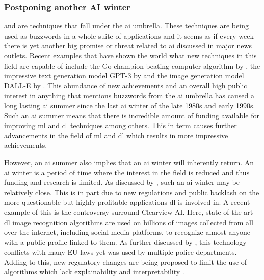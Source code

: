 
\subsubsection{Postponing another AI winter}
\label{subsubsec:bci_gaining_popularity_improved_data_processing_no_ai_winter}

 and  are techniques that fall under the \gls{ai} umbrella.
These techniques are being used as buzzwords in a whole suite of applications and it seems as if every week there is yet another big promise or threat related to \gls{ai} discussed in major news outlets.
Recent examples that have shown the world what new techniques in this field are capable of include the Go champion beating computer algorithm by \citet{alphago}, the impressive text generation model GPT-3 by \citet{GPT3} and the image generation model DALL-E by \citet{dall_e}.
This abundance of new achievements and an overall high public interest in anything that mentions buzzwords from the \gls{ai} umbrella has caused a long lasting \gls{ai} summer since the last \gls{ai} winter of the late 1980s and early 1990s.
Such an \gls{ai} summer means that there is incredible amount of funding available for improving \gls{ml} and \gls{dl} techniques among others.
This in term causes further advancements in the field of \gls{ml} and \gls{dl} which results in more impressive achievements.

However, an \gls{ai} summer also implies that an \gls{ai} winter will inherently return.
An \gls{ai} winter is a period of time where the interest in the field is reduced and thus funding and research is limited.
As discussed by \citet{new_ai_winter}, such an \gls{ai} winter may be relatively close.
This is in part due to new regulations and public backlash on the more questionable but highly profitable applications \gls{dl} is involved in.
A recent example of this is the controversy surround Clearview AI.
Here, state-of-the-art \gls{dl} image recognition algorithms are used on billions of images collected from all over the internet, including social-media platforms, to recognize almost anyone with a public profile linked to them.
As further discussed by \citet{clearview_ai}, this technology conflicts with many EU laws yet was used by multiple police departments.
Adding to this, new regulatory changes are being proposed to limit the use of algorithms which lack explainability and interpretability \citep{eu_ai_blackbox_report, explainable_ai_policy}.

